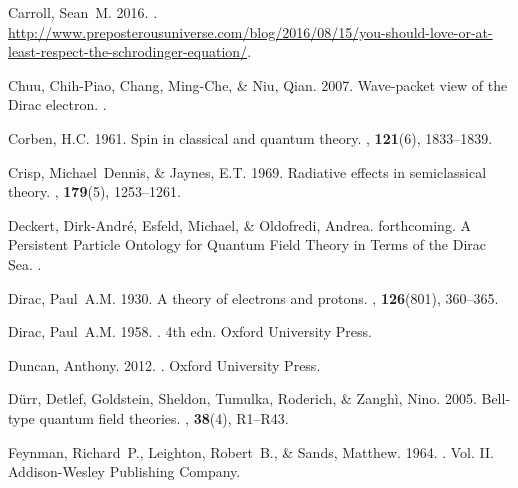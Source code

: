 \documentclass[12pt,secnumarabic,amsmath,amssymb,balancelastpage,nofootinbib]{article}
\begin{document}
\begin{thebibliography}{}
Carroll, Sean~M. 2016.
.
\newblock
  \url{http://www.preposterousuniverse.com/blog/2016/08/15/you-should-love-or-at-least-respect-the-schrodinger-equation/}.

Chuu, Chih-Piao, Chang, Ming-Che, \& Niu, Qian. 2007.
\newblock Wave-packet view of the Dirac electron.
.

Corben, H.C. 1961.
\newblock Spin in classical and quantum theory.
, {\bf 121}(6), 1833--1839.

Crisp, Michael~Dennis, \& Jaynes, E.T. 1969.
\newblock Radiative effects in semiclassical theory.
, {\bf 179}(5), 1253--1261.

Deckert, Dirk-Andr\'{e}, Esfeld, Michael, \& Oldofredi, Andrea. forthcoming.
\newblock A Persistent Particle Ontology for Quantum Field Theory in Terms of
  the Dirac Sea.
.

Dirac, Paul~A.M. 1930.
\newblock A theory of electrons and protons.
, {\bf 126}(801), 360--365.

Dirac, Paul~A.M. 1958.
. 4th edn.
\newblock Oxford University Press.

Duncan, Anthony. 2012.
.
\newblock Oxford University Press.

D{\"u}rr, Detlef, Goldstein, Sheldon, Tumulka, Roderich, \& Zangh\`{i}, Nino.
  2005.
\newblock Bell-type quantum field theories.
, {\bf 38}(4),
  R1--R43.

Feynman, Richard~P., Leighton, Robert~B., \& Sands, Matthew. 1964.
.
\newblock  Vol. II.
\newblock Addison-Wesley Publishing Company.


\end{thebibliography}
\end{document}
